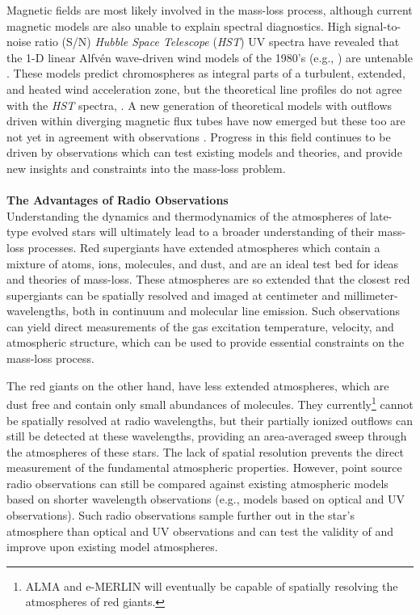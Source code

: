 Magnetic fields are most likely involved in the mass-loss process, although current magnetic models are also unable to explain spectral diagnostics. High signal-to-noise ratio (S/N) \textit{Hubble Space Telescope} (\textit{HST}) UV spectra have revealed that the 1-D linear Alfv\'en wave-driven wind models of the 1980’s (e.g., \citealt{hartmann_1980,harper_1988}) are untenable \citep{harper_2001}. These models predict chromospheres as integral parts of a turbulent, extended, and heated wind acceleration zone, but the theoretical line profiles do not agree with the \textit{HST} spectra, \cite[e.g.,][]{judge_1998}. A new generation of theoretical models with outflows driven within diverging magnetic flux tubes have now emerged \citep{falceta_2006, suzuki_2007} but these too are not yet in agreement with observations \citep{crowley_2009}. Progress in this field continues to be driven by observations which can test existing models and theories, and provide new insights and constraints into the mass-loss problem.\\
\\
\textbf{The Advantages of Radio Observations}\\
Understanding the dynamics and thermodynamics of the atmospheres of late-type evolved stars will ultimately lead to a broader understanding of their mass-loss processes. Red supergiants have extended atmospheres which contain a mixture of atoms, ions, molecules, and dust, and are an ideal test bed for ideas and theories of mass-loss. These atmospheres are so extended that the closest red supergiants can be spatially resolved and imaged at centimeter and millimeter-wavelengths, both in continuum and molecular line emission. Such observations can yield direct measurements of the gas excitation temperature, velocity, and atmospheric structure, which can be used to provide essential constraints on the mass-loss process. 

The red giants on the other hand, have less extended atmospheres, which are dust free and contain only small abundances of molecules. They currently\footnote{ALMA and e-MERLIN will eventually be capable of spatially resolving the atmospheres of red giants.} cannot be spatially resolved at radio wavelengths, but their partially ionized outflows can still be detected at these wavelengths, providing an area-averaged sweep through the atmospheres of these stars. The lack of spatial resolution prevents the direct measurement of the fundamental atmospheric properties. However, point source radio observations can still be compared against existing atmospheric models based on shorter wavelength observations (e.g., models based on optical and UV observations). Such radio observations sample further out in the star's atmosphere than optical and UV observations and can test the validity of and improve upon existing model atmospheres. 

